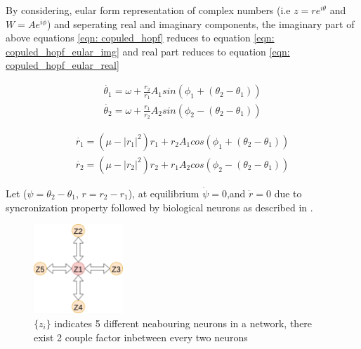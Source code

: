 \documentclass{article}
\begin{document}
By considering, eular form representation of complex numbers (i.e $z = re^{i\theta}$ and $W = Ae^{i\phi}$) and seperating real and imaginary components, the imaginary part of above equations \ref{eqn: copuled_hopf} reduces to equation \ref{eqn: copuled_hopf_eular_img} and real part reduces to equation \ref{eqn: copuled_hopf_eular_real} 

\begin{subequations}
\label{eqn: copuled_hopf_eular_img}
\begin{align}
 \dot{\theta_1} = \omega + \frac{r_2}{r_1} A_1sin(\phi_1 + (\theta_2 - \theta_1)) \\ 
 \dot{\theta_2} = \omega + \frac{r_1}{r_2} A_2sin(\phi_2 - (\theta_2 - \theta_1)) 
\end{align}
\end{subequations}

\begin{subequations}
\label{eqn: copuled_hopf_eular_real}
\begin{align}
 \dot{r_1} = (\mu - |r_1|^2)r_1 + r_2 A_1cos(\phi_1 + (\theta_2 - \theta_1)) \\ 
 \dot{r_2} = (\mu - |r_2|^2)r_2 + r_1 A_2cos(\phi_2 - (\theta_2 - \theta_1)) 
\end{align}
\end{subequations}

Let ($\psi = \theta_2 - \theta_1$, $r = r_2 - r_1$), at equilibrium $\dot{\psi} = 0$,and $\dot{r} = 0$ due to syncronization property followed by biological neurons as described in \cite{varela2001brainweb, golomb1994clustering}.

\begin{figure}
 \centering
 \includegraphics[width=0.3\textwidth]{network.png}
 \caption{$\{z_i\}$ indicates 5 different neabouring neurons in a network, there exist 2 couple factor inbetween every two neurons}
 \label{fig: network_neurons}
\end{figure}
\end{document}
